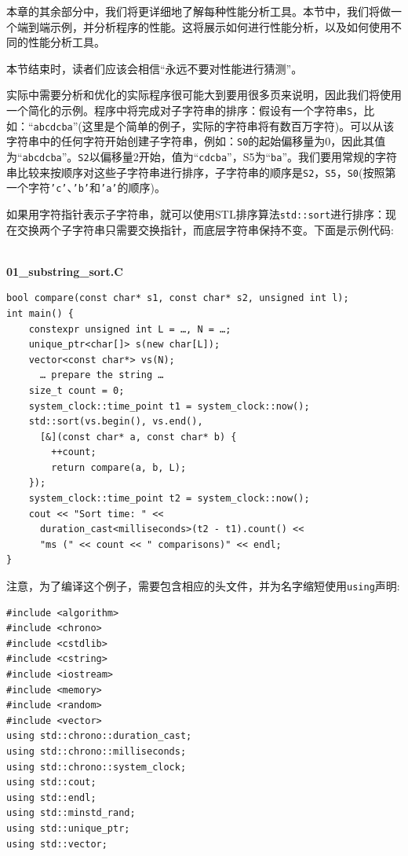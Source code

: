 
本章的其余部分中，我们将更详细地了解每种性能分析工具。本节中，我们将做一个端到端示例，并分析程序的性能。这将展示如何进行性能分析，以及如何使用不同的性能分析工具。

本节结束时，读者们应该会相信“永远不要对性能进行猜测”。

实际中需要分析和优化的实际程序很可能大到要用很多页来说明，因此我们将使用一个简化的示例。程序中将完成对子字符串的排序：假设有一个字符串\texttt{S}，比如：“\texttt{abcdcba}”(这里是个简单的例子，实际的字符串将有数百万字符)。可以从该字符串中的任何字符开始创建子字符串，例如：\texttt{S0}的起始偏移量为0，因此其值为“\texttt{abcdcba}”。\texttt{S2}以偏移量2开始，值为“\texttt{cdcba}”，S5为“\texttt{ba}”。我们要用常规的字符串比较来按顺序对这些子字符串进行排序，子字符串的顺序是\texttt{S2}，\texttt{S5}，\texttt{S0}(按照第一个字符\texttt{'c'}、\texttt{'b'}和\texttt{'a'}的顺序)。

如果用字符指针表示子字符串，就可以使用STL排序算法\texttt{std::sort}进行排序：现在交换两个子字符串只需要交换指针，而底层字符串保持不变。下面是示例代码:

\hspace*{\fill} \\ %
\noindent
\textbf{01\_substring\_sort.C}
\begin{lstlisting}[style=styleCXX]
bool compare(const char* s1, const char* s2, unsigned int l);
int main() {
	constexpr unsigned int L = …, N = …;
	unique_ptr<char[]> s(new char[L]);
	vector<const char*> vs(N);
	  … prepare the string …
	size_t count = 0;
	system_clock::time_point t1 = system_clock::now();
	std::sort(vs.begin(), vs.end(),
	  [&](const char* a, const char* b) {
		++count;
		return compare(a, b, L);
	});
	system_clock::time_point t2 = system_clock::now();
	cout << "Sort time: " <<
	  duration_cast<milliseconds>(t2 - t1).count() <<
	  "ms (" << count << " comparisons)" << endl;
}
\end{lstlisting}

注意，为了编译这个例子，需要包含相应的头文件，并为名字缩短使用\texttt{using}声明:

\begin{lstlisting}[style=styleCXX]
#include <algorithm>
#include <chrono>
#include <cstdlib>
#include <cstring>
#include <iostream>
#include <memory>
#include <random>
#include <vector>
using std::chrono::duration_cast;
using std::chrono::milliseconds;
using std::chrono::system_clock;
using std::cout;
using std::endl;
using std::minstd_rand;
using std::unique_ptr;
using std::vector;
\end{lstlisting}

